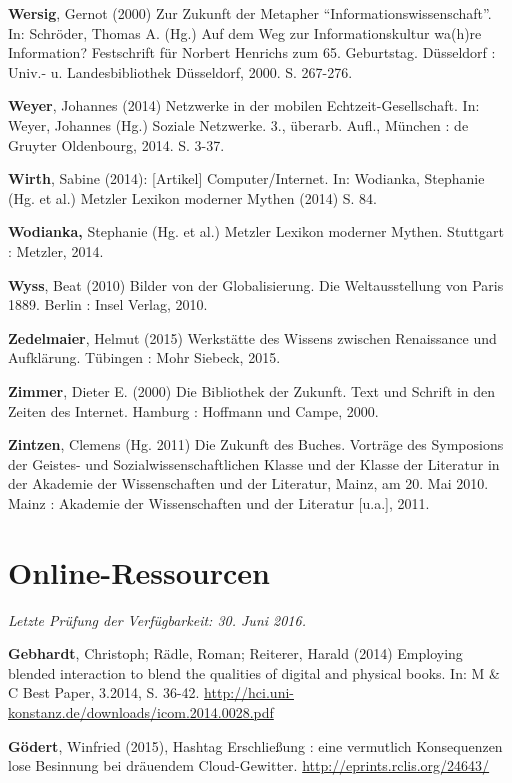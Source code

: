 \documentclass[a4paper,
fontsize=11pt,
oneside,
numbers=noperiodatend,
parskip=half-,
bibliography=totoc,
final
]{scrartcl}
\begin{document}
\textbf{Wersig}, Gernot (2000) Zur Zukunft der Metapher
\enquote{Informationswissenschaft}. In: Schröder, Thomas A. (Hg.) Auf
dem Weg zur Informationskultur wa(h)re Information? Festschrift für
Norbert Henrichs zum 65. Geburtstag. Düsseldorf : Univ.- u.
Landesbibliothek Düsseldorf, 2000. S. 267-276.

\textbf{Weyer}, Johannes (2014) Netzwerke in der mobilen
Echtzeit-Gesellschaft. In: Weyer, Johannes (Hg.) Soziale Netzwerke. 3.,
überarb. Aufl., München : de Gruyter Oldenbourg, 2014. S. 3-37.

\textbf{Wirth}, Sabine (2014): {[}Artikel{]} Computer/Internet. In:
Wodianka, Stephanie (Hg. et al.) Metzler Lexikon moderner Mythen (2014)
S. 84.

\textbf{Wodianka,} Stephanie (Hg. et al.) Metzler Lexikon moderner
Mythen. Stuttgart : Metzler, 2014.

\textbf{Wyss}, Beat (2010) Bilder von der Globalisierung. Die
Weltausstellung von Paris 1889. Berlin : Insel Verlag, 2010.

\textbf{Zedelmaier}, Helmut (2015) Werkstätte des Wissens zwischen
Renaissance und Aufklärung. Tübingen : Mohr Siebeck, 2015.

\textbf{Zimmer}, Dieter E. (2000) Die Bibliothek der Zukunft. Text und
Schrift in den Zeiten des Internet. Hamburg : Hoffmann und Campe, 2000.

\textbf{Zintzen}, Clemens (Hg. 2011) Die Zukunft des Buches. Vorträge
des Symposions der Geistes- und Sozialwissenschaftlichen Klasse und der
Klasse der Literatur in der Akademie der Wissenschaften und der
Literatur, Mainz, am 20. Mai 2010. Mainz : Akademie der Wissenschaften
und der Literatur {[}u.a.{]}, 2011.

\section*{Online-Ressourcen}\label{online-ressourcen}

\emph{Letzte Prüfung der Verfügbarkeit: 30. Juni 2016.}

\textbf{Gebhardt}, Christoph; Rädle, Roman; Reiterer, Harald (2014)
Employing blended interaction to blend the qualities of digital and
physical books. In: M \& C Best Paper, 3.2014, S. 36-42.
\url{http://hci.uni-konstanz.de/downloads/icom.2014.0028.pdf}

\textbf{Gödert}, Winfried (2015), Hashtag Erschließung : eine vermutlich
Konsequenzen lose Besinnung bei dräuendem Cloud-Gewitter.
\url{http://eprints.rclis.org/24643/}
\end{document}
